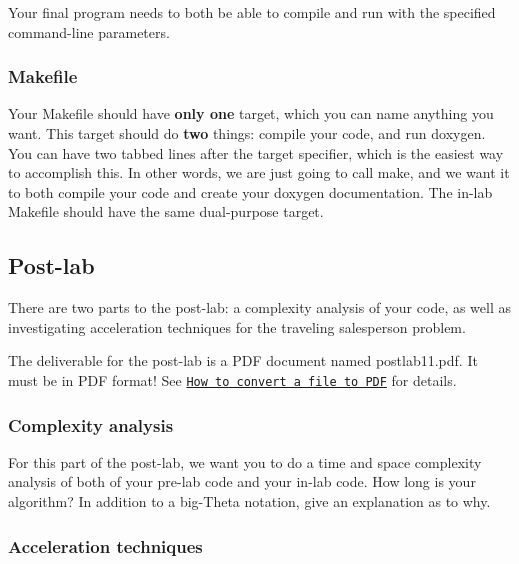 Your final program needs to both be able to compile and run with the specified command-\/line parameters.

\subsubsection*{Makefile}

Your Makefile should have {\bfseries only one} target, which you can name anything you want. This target should do {\bfseries two} things\+: compile your code, and run doxygen. You can have two tabbed lines after the target specifier, which is the easiest way to accomplish this. In other words, we are just going to call {\ttfamily make}, and we want it to both compile your code and create your doxygen documentation. The in-\/lab Makefile should have the same dual-\/purpose target. 



\subsection*{Post-\/lab }

There are two parts to the post-\/lab\+: a complexity analysis of your code, as well as investigating acceleration techniques for the traveling salesperson problem.

The deliverable for the post-\/lab is a P\+DF document named postlab11.\+pdf. It must be in P\+DF format! See \href{../../docs/convert_to_pdf.html}{\tt How to convert a file to P\+DF} for details.

\subsubsection*{Complexity analysis}

For this part of the post-\/lab, we want you to do a time and space complexity analysis of both of your pre-\/lab code and your in-\/lab code. How long is your algorithm? In addition to a big-\/\+Theta notation, give an explanation as to why.

\subsubsection*{Acceleration techniques}

